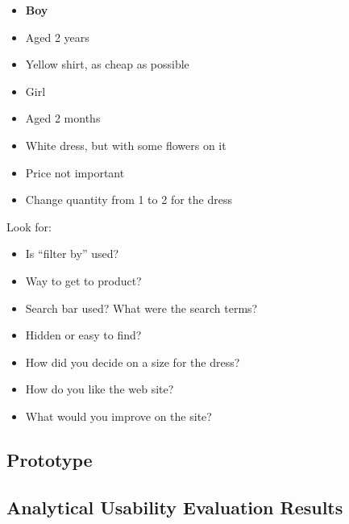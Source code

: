 \begin{itemize}\addtolength{\itemsep}{-0.5\baselineskip}
 \item \textbf{Boy}
 \item Aged 2 years
 \item Yellow shirt, as cheap as possible
\end{itemize}
\begin{itemize}\addtolength{\itemsep}{-0.5\baselineskip}
 \item Girl
 \item Aged 2 months
 \item White dress, but with some flowers on it
 \item Price not important
\end{itemize}
\begin{itemize}
 \item Change quantity from 1 to 2 for the dress
\end{itemize}

Look for:
\begin{itemize}\addtolength{\itemsep}{-0.5\baselineskip}
 \item Is ``filter by'' used?
 \item Way to get to product?
 \item Search bar used? What were the search terms?
\end{itemize}

\begin{itemize}\addtolength{\itemsep}{-0.5\baselineskip}
 \item Hidden or easy to find?
 \item How did you decide on a size for the dress?
 \item How do you like the web site?
 \item What would you improve on the site?
\end{itemize}

\subsection{Prototype}


\subsection{Analytical Usability Evaluation Results}



